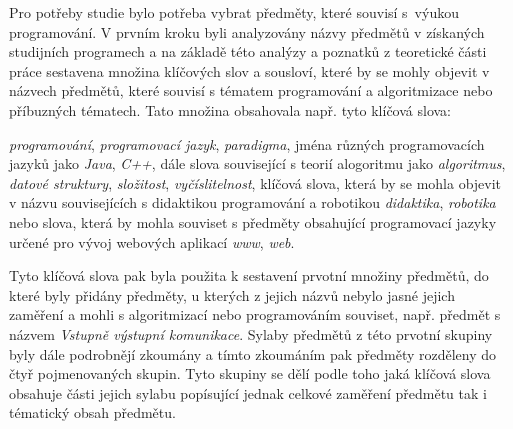 \documentclass[FP,DP]{tulthesis}
\begin{document}
{{{{{{{Pro potřeby studie bylo potřeba vybrat předměty, které souvisí s~výukou programování. V prvním kroku byli analyzovány názvy předmětů v získaných studijních programech a na základě této analýzy a poznatků z teoretické části práce sestavena  množina klíčových slov a sousloví, které by se mohly objevit v názvech předmětů, které souvisí s tématem programování a algoritmizace nebo příbuzných tématech. Tato množina obsahovala např. tyto klíčová slova:\begin{displayquote}
\textit{programování}, \textit{programovací jazyk}, \textit{paradigma}, jména různých programovacích jazyků jako \textit{Java}, \textit{C++}, dále slova související s teorií alogoritmu jako \textit{algoritmus}, \textit{datové struktury}, \textit{složitost}, \textit{vyčíslitelnost}, klíčová slova, která by se mohla objevit v názvu souvisejících s didaktikou programování a robotikou \textit{didaktika}, \textit{robotika} nebo slova, která by mohla souviset s předměty obsahující programovací jazyky určené pro vývoj webových aplikací \textit{www}, \textit{web}.
\end{displayquote}  
Tyto klíčová slova pak byla použita k sestavení prvotní množiny předmětů, do které byly přidány předměty, u kterých z jejich názvů nebylo jasné jejich zaměření a mohli s algoritmizací nebo programováním souviset, např. předmět s názvem \textit{Vstupně výstupní komunikace}.
Sylaby předmětů z této prvotní skupiny byly dále podrobnějí zkoumány a  tímto zkoumáním pak předměty rozděleny do čtyř pojmenovaných skupin. Tyto skupiny se dělí podle toho jaká klíčová slova obsahuje části jejich sylabu popísující jednak celkové zaměření předmětu tak i tématický obsah předmětu.

}}}}}}}
\end{document}

